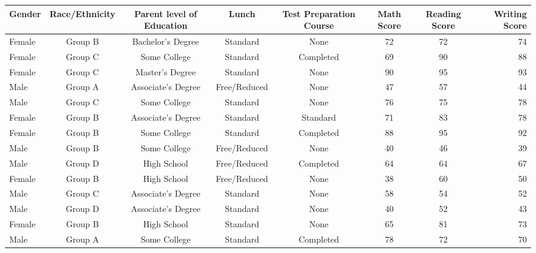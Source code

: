 \documentclass{article}
\begin{document}
	
	\begin{table}[h!]
		\begin{center}
		\label{tab:table1}
		\begin{tiny}
		\begin{tabular}{|l|c|c|c|c|c|c|r|}
			\hline
			Gender & Race/Ethnicity & Parent level of Education & Lunch & Test Preparation Course & Math Score & Reading Score & Writing Score\\
			\hline
			Female & Group B & Bachelor's Degree & Standard & None & 72 & 72 & 74\\
			\hline
			Female & Group C & Some College & Standard & Completed & 69 & 90 & 88\\
			\hline
			Female & Group C & Master's Degree & Standard & None & 90 & 95 & 93\\
			\hline
			Male & Group A & Associate's Degree & Free/Reduced & None & 47 & 57 & 44\\
			\hline
			Male & Group C & Some College & Standard & None & 76 & 75 & 78\\
			\hline
			Female & Group B & Associate's Degree & Standard & Standard & 71 & 83 & 78\\
			\hline
			Female & Group B & Some College & Standard & Completed & 88 & 95 & 92\\
			\hline
			Male & Group B & Some College & Free/Reduced & None & 40 & 46 & 39\\
			\hline
			Male & Group D & High School & Free/Reduced & Completed & 64 & 64 & 67\\
			\hline
			Female & Group B & High School & Free/Reduced & None & 38 & 60 & 50\\
			\hline
			Male & Group C & Associate's Degree & Standard & None & 58 & 54 & 52\\
			\hline
			Male & Group D & Associate's Degree & Standard & None & 40 & 52 & 43\\
			\hline
			Female & Group B & High School & Standard & None & 65 & 81 & 73\\
			\hline
			Male & Group A & Some College & Standard & Completed & 78 & 72 & 70\\
			\hline
			\end{tabular}
		\end{tiny}
		\end{center}
	\end{table}
\end{document}
